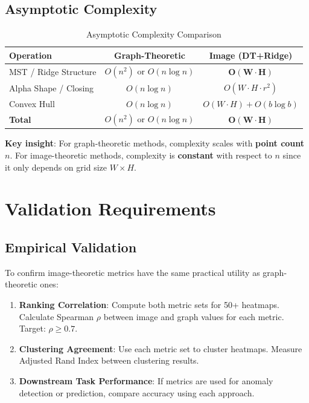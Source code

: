 \documentclass[11pt]{article}
\begin{document}
\subsection{Asymptotic Complexity}

\begin{table}[h]
\centering
\caption{Asymptotic Complexity Comparison}
\begin{tabular}{@{}lcc@{}}
\toprule
\textbf{Operation} & \textbf{Graph-Theoretic} & \textbf{Image (DT+Ridge)} \\
\midrule
MST / Ridge Structure & $O(n^2)$ or $O(n \log n)$ & $\mathbf{O(W \cdot H)}$ \\
Alpha Shape / Closing & $O(n \log n)$ & $O(W \cdot H \cdot r^2)$ \\
Convex Hull & $O(n \log n)$ & $O(W \cdot H) + O(b \log b)$ \\
\midrule
\textbf{Total} & $O(n^2)$ or $O(n \log n)$ & $\mathbf{O(W \cdot H)}$ \\
\bottomrule
\end{tabular}
\end{table}

\textbf{Key insight}: For graph-theoretic methods, complexity scales with \textbf{point count} $n$. For image-theoretic methods, complexity is \textbf{constant} with respect to $n$ since it only depends on grid size $W \times H$.

\section{Validation Requirements}

\subsection{Empirical Validation}

To confirm image-theoretic metrics have the same practical utility as graph-theoretic ones:

\begin{enumerate}
    \item \textbf{Ranking Correlation}: Compute both metric sets for 50+ heatmaps. Calculate Spearman $\rho$ between image and graph values for each metric. Target: $\rho \geq 0.7$.
    
    \item \textbf{Clustering Agreement}: Use each metric set to cluster heatmaps. Measure Adjusted Rand Index between clustering results.
    
    \item \textbf{Downstream Task Performance}: If metrics are used for anomaly detection or prediction, compare accuracy using each approach.
\end{enumerate}
\end{document}
